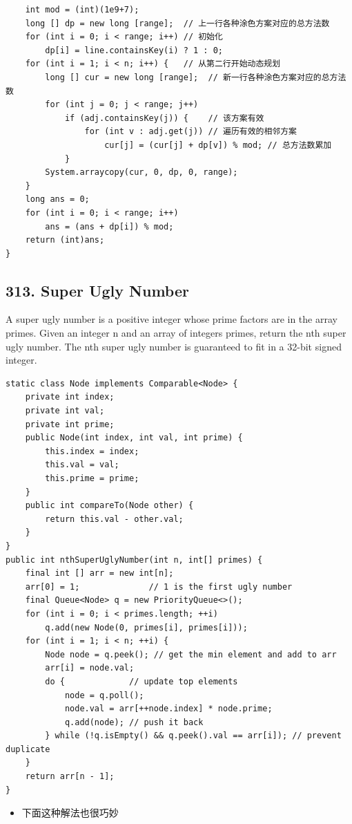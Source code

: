 \documentclass[9pt, b5paper]{article}
\begin{document}
\begin{verbatim}
    int mod = (int)(1e9+7);
    long [] dp = new long [range];  // 上一行各种涂色方案对应的总方法数
    for (int i = 0; i < range; i++) // 初始化
        dp[i] = line.containsKey(i) ? 1 : 0;
    for (int i = 1; i < n; i++) {   // 从第二行开始动态规划
        long [] cur = new long [range];  // 新一行各种涂色方案对应的总方法数
        for (int j = 0; j < range; j++) 
            if (adj.containsKey(j)) {    // 该方案有效
                for (int v : adj.get(j)) // 遍历有效的相邻方案
                    cur[j] = (cur[j] + dp[v]) % mod; // 总方法数累加
            }
        System.arraycopy(cur, 0, dp, 0, range);
    }
    long ans = 0;
    for (int i = 0; i < range; i++) 
        ans = (ans + dp[i]) % mod;
    return (int)ans;
}
\end{verbatim}

\subsection{313. Super Ugly Number}
\label{sec-4-6}
A super ugly number is a positive integer whose prime factors are in the array primes.
Given an integer n and an array of integers primes, return the nth super ugly number.
The nth super ugly number is guaranteed to fit in a 32-bit signed integer.
\begin{verbatim}
static class Node implements Comparable<Node> {
    private int index;
    private int val;
    private int prime;
    public Node(int index, int val, int prime) {
        this.index = index;
        this.val = val;
        this.prime = prime;
    }
    public int compareTo(Node other) {
        return this.val - other.val;
    }
}
public int nthSuperUglyNumber(int n, int[] primes) {
    final int [] arr = new int[n];
    arr[0] = 1;              // 1 is the first ugly number
    final Queue<Node> q = new PriorityQueue<>();
    for (int i = 0; i < primes.length; ++i) 
        q.add(new Node(0, primes[i], primes[i]));
    for (int i = 1; i < n; ++i) {
        Node node = q.peek(); // get the min element and add to arr
        arr[i] = node.val;
        do {             // update top elements
            node = q.poll();
            node.val = arr[++node.index] * node.prime;
            q.add(node); // push it back
        } while (!q.isEmpty() && q.peek().val == arr[i]); // prevent duplicate
    }
    return arr[n - 1];
}
\end{verbatim}
\begin{itemize}
\item 下面这种解法也很巧妙
\end{itemize}
\end{document}
